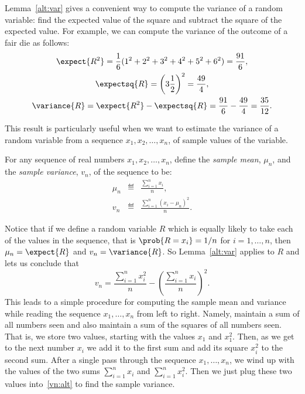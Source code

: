 \begin{editingnotes}

Lemma~\ref{alt:var} gives a convenient way to compute the variance of a
random variable: find the expected value of the square and subtract the
square of the expected value.  For example, we can compute the variance of
the outcome of a fair die as follows:
\begin{gather*}
  \expect{R^2} = \frac{1}{6} (1^2 + 2^2 + 3^2 + 4^2 + 5^2 + 6^2) = \frac{91}{6}, \\
  \expectsq{R} = \left(3 \frac{1}{2}\right)^2 = \frac{49}{4}, \\
  \variance{R}  = \expect{R^2} - \expectsq{R}
  = \frac{91}{6} - \frac{49}{4} = \frac{35}{12}.
\end{gather*}

This result is particularly useful when we want to estimate the variance
of a random variable from a sequence $x_1,x_2,\dots,x_n$, of sample values
of the variable.

\begin{definition*}
For any sequence of real numbers $x_1,x_2,\dots,x_n$, define the
\emph{sample mean}, $\mu_n$, and the \emph{sample variance}, $v_n$, of the
sequence to be:
\begin{eqnarray*}
\mu_n  & \eqdef & \frac{\sum_{i=1}^n x_i}{n},\\
v_n  & \eqdef & \frac{\sum_{i=1}^n (x_i - \mu_n)^2}{n}.
\end{eqnarray*}
\end{definition*}
Notice that if we define a random variable $R$ which is equally likely
to take each of the values in the sequence, that is $\prob{R = x_i} = 1/n$
for $i = 1,\dots,n$, then $\mu_n = \expect{R}$ and $v_n = \variance{R}$.
So Lemma~\ref{alt:var} applies to $R$ and lets us conclude that
\begin{equation}\label{vn:alt}
v_n = \frac{\sum_{i=1}^n x_i^2}{n} - \left(\frac{\sum_{i=1}^n x_i}{n}\right)^2.
\end{equation}
This leads to a simple procedure for computing the sample mean and
variance while reading the sequence $x_1,\dots,x_n$ from left to right.
Namely, maintain a sum of all numbers seen and also maintain a sum of the
squares of all numbers seen.  That is, we store two values, starting with
the values $x_1$ and $x_1^2$.  Then, as we get to the next number $x_i$
we add it to the first sum and add its square $x_{i}^2$ to the second
sum.  After a single pass through the sequence $x_1,\dots,x_n$, we wind up
with the values of the two sums $\sum_{i=1}^n x_i$ and $\sum_{i=1}^n
x_i^2$.  Then we just plug these two values into~\eqref{vn:alt} to find
the sample variance.


\end{editingnotes}
